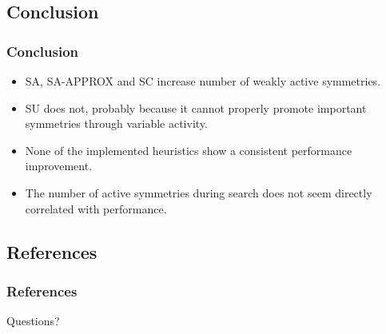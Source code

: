 \documentclass{beamer}
\begin{document}
	\subsection{Conclusion}
	\begin{frame}
		\frametitle{Conclusion}

		\begin{itemize}
			\item SA, SA-APPROX and SC increase number of weakly active symmetries.
			\item<+-> SU does not, probably because it cannot properly promote important
			symmetries through variable activity.
			\item<+-> None of the implemented heuristics show a consistent performance
			improvement.
			\item<+-> The number of active symmetries during search does not seem directly
			correlated with performance.
		\end{itemize}

	\end{frame}

	\subsection{References}
	\begin{frame}[allowframebreaks]
		\frametitle{References}
		
		
	\end{frame}

	\begin{frame}
	\Huge{\centerline{Questions?}}
	\end{frame}
\end{document}
